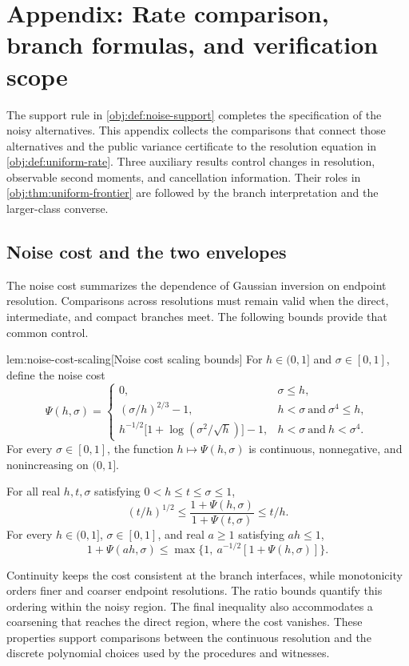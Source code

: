 \section{Appendix: Rate comparison, branch formulas, and verification scope}

The support rule in \cref{obj:def:noise-support} completes the specification of the noisy alternatives. This appendix collects the comparisons that connect those alternatives and the public variance certificate to the resolution equation in \cref{obj:def:uniform-rate}. Three auxiliary results control changes in resolution, observable second moments, and cancellation information. Their roles in \cref{obj:thm:uniform-frontier} are followed by the branch interpretation and the larger-class converse.

\subsection{Noise cost and the two envelopes}

The noise cost summarizes the dependence of Gaussian inversion on endpoint resolution. Comparisons across resolutions must remain valid when the direct, intermediate, and compact branches meet. The following bounds provide that common control.

\begin{lemmav}{lem:noise-cost-scaling}[Noise cost scaling bounds]
For \(h\in(0,1]\) and \(\sigma\in[0,1]\), define the noise cost
\[
\Psi(h,\sigma)=
\begin{cases}
0, & \sigma\le h,\\
(\sigma/h)^{2/3}-1, & h<\sigma\ \text{and}\ \sigma^4\le h,\\
h^{-1/2}\bigl[1+\log(\sigma^2/\sqrt h)\bigr]-1,
& h<\sigma\ \text{and}\ h<\sigma^4.
\end{cases}
\]
For every \(\sigma\in[0,1]\), the function \(h\mapsto\Psi(h,\sigma)\) is continuous, nonnegative, and nonincreasing on \((0,1]\).

For all real \(h,t,\sigma\) satisfying \(0<h\le t\le\sigma\le1\),
\[
(t/h)^{1/2}
\le
\frac{1+\Psi(h,\sigma)}{1+\Psi(t,\sigma)}
\le t/h.
\]
For every \(h\in(0,1]\), \(\sigma\in[0,1]\), and real \(a\ge1\) satisfying \(ah\le1\),
\[
1+\Psi(ah,\sigma)
\le
\max\bigl\{1,\ a^{-1/2}[1+\Psi(h,\sigma)]\bigr\}.
\]
\end{lemmav}

Continuity keeps the cost consistent at the branch interfaces, while monotonicity orders finer and coarser endpoint resolutions. The ratio bounds quantify this ordering within the noisy region. The final inequality also accommodates a coarsening that reaches the direct region, where the cost vanishes. These properties support comparisons between the continuous resolution and the discrete polynomial choices used by the procedures and witnesses.

